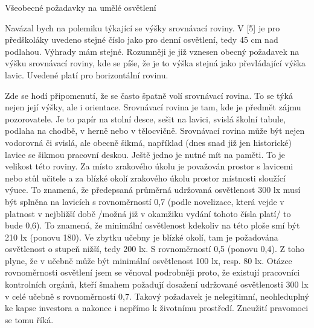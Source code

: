 \chap Všeobecné požadavky na umělé osvětlení

Navázal bych na polemiku týkající se výšky srovnávací roviny. V [5] je pro předškoláky uvedeno stejné číslo jako pro denní osvětlení, tedy 45 cm nad podlahou. Výhrady mám stejné. Rozumněji je již vznesen obecný požadavek na výšku srovnávací roviny, kde se píše, že je to výška stejná jako převládající výška lavic. Uvedené platí pro horizontální rovinu.

\medskip
Zde se hodí připomenutí, že se často špatně volí srovnávací rovina. To se týká nejen její výšky, ale i orientace. Srovnávací rovina je tam, kde je předmět zájmu pozorovatele. Je to papír na stolní desce, sešit na lavici, svislá školní tabule, podlaha na chodbě, v herně nebo v tělocvičně. Srovnávací rovina může být nejen vodorovná či svislá, ale obecně šikmá, například (dnes snad již jen historické) lavice se šikmou pracovní deskou.
\medskip
Ještě jedno je nutné mít na paměti. To je velikost této roviny. Za místo zrakového úkolu je považován prostor s lavicemi nebo stůl učitele a za blízké okolí zrakového úkolu prostor místnosti sloužící výuce. To znamená, že předepsaná průměrná udržovaná osvětlenost 300 lx musí být splněna na lavicích s rovnoměrností 0,7 (podle novelizace, která vejde v platnost v nejbližší době /možná již v okamžiku vydání tohoto čísla platí/ to bude 0,6). To znamená, že minimální osvětlenost kdekoliv na této ploše smí být 210 lx (ponovu 180). Ve zbytku učebny je blízké okolí, tam je požadována osvětlenost o stupeň nižší, tedy 200 lx. S rovnoměrností 0,5 (ponovu 0,4). Z toho plyne, že v učebně může být minimální osvětlenost 100 lx, resp. 80 lx. Otázce rovnoměrnosti osvětlení jsem se věnoval podrobněji proto, že existují pracovníci kontrolních orgánů, kteří šmahem požadují dosažení udržované osvětlenosti 300 lx v celé učebně s rovnoměrností 0,7. Takový požadavek je nelegitimní, neohleduplný ke kapse investora a nakonec i nepřímo k životnímu prostředí. Zneužití pravomoci se tomu říká.
\medskip

